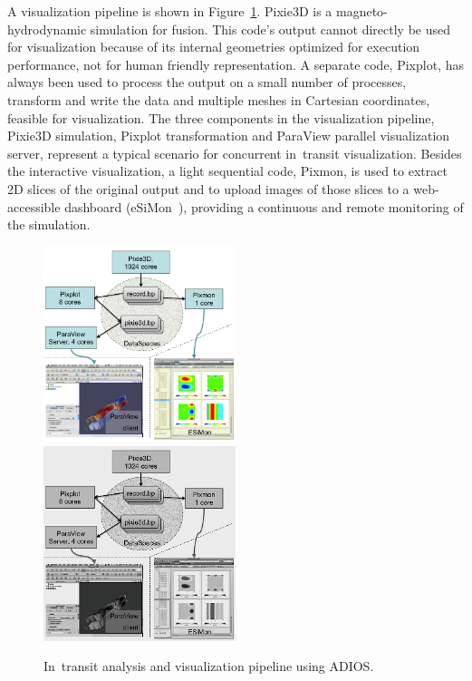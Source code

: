 
A visualization pipeline is shown in Figure~\ref{part3-ch5-adios:fig:intransitviz}. Pixie3D \cite{ADIOS:Chacon:2002} is a  magneto-hydrodynamic simulation for fusion. This code's output cannot directly be used for visualization because of its internal geometries optimized for execution performance, not for human friendly representation. A separate code, Pixplot, has always been used to process the output on a small number of processes, transform and write the data and multiple meshes in Cartesian coordinates, feasible for visualization. The three components in the visualization pipeline, Pixie3D simulation, Pixplot transformation and ParaView parallel visualization server, represent a typical scenario for concurrent in~transit visualization. Besides the interactive visualization, a light sequential code, Pixmon, is used to extract 2D slices of the original output and to upload images of those slices to a web-accessible dashboard (eSiMon~\cite{ADIOS:Tchoua:cts12}), providing a continuous and remote monitoring of the simulation.


\begin{figure}[h!]
\centering
\myIfColor
{
\includegraphics[width=0.5\textwidth]{Chapters/part3-ch5-adios/figs/intransitviz.png}
}
{
\includegraphics[width=0.5\textwidth]{Chapters/part3-ch5-adios/figs/intransitviz-bw.png}
}
\caption[]
{In~transit analysis and visualization pipeline using ADIOS.
}
\label{part3-ch5-adios:fig:intransitviz}
\end{figure}

